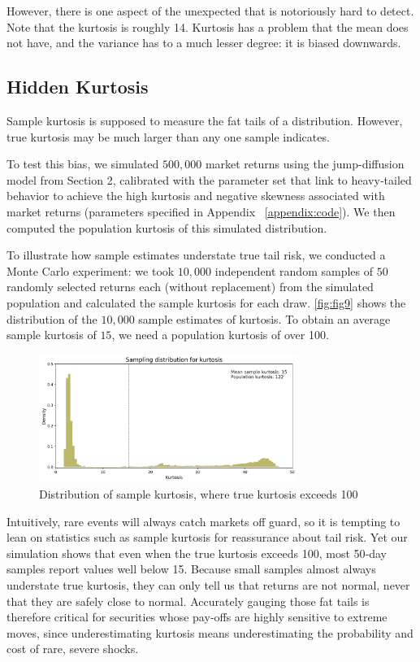 However, there is one aspect of the unexpected that is notoriously hard to detect. Note that the kurtosis is roughly 14. Kurtosis has a problem that the mean does not have, and the variance has to a much lesser degree: it is biased downwards.

\subsection{Hidden Kurtosis}
Sample kurtosis is supposed to measure the fat tails of a distribution. However, true kurtosis may be much larger than any one sample indicates. 

To test this bias, we simulated $500,000$ market returns using the jump-diffusion model from Section 2, calibrated with the parameter set that \citet{backus2011disasters} link to heavy‐tailed behavior to achieve the high kurtosis and negative skewness associated with market returns (parameters specified in Appendix ~\ref{appendix:code}). We then computed the population kurtosis of this simulated distribution.

To illustrate how sample estimates understate true tail risk, we conducted a Monte Carlo experiment: we took $10,000$ independent random samples of $50$ randomly selected returns each (without replacement) from the simulated population and calculated the sample kurtosis for each draw. \autoref{fig:fig9} shows the distribution of the $10,000$ sample estimates of kurtosis. To obtain an average sample kurtosis of $15$, we need a population kurtosis of over 100.

\begin{figure}[h]
    \centering
    \includegraphics[width=0.75\textwidth]{fig9.png}
    \caption{Distribution of sample kurtosis, where true kurtosis exceeds 100}
    \label{fig:fig9}
\end{figure}

Intuitively, rare events will always catch markets off guard, so it is tempting to lean on statistics such as sample kurtosis for reassurance about tail risk. Yet our simulation shows that even when the true kurtosis exceeds 100, most 50‑day samples report values well below 15. Because small samples almost always understate true kurtosis, they can only tell us that returns are not normal, never that they are safely close to normal. Accurately gauging those fat tails is therefore critical for securities whose pay‑offs are highly sensitive to extreme moves, since underestimating kurtosis means underestimating the probability and cost of rare, severe shocks.